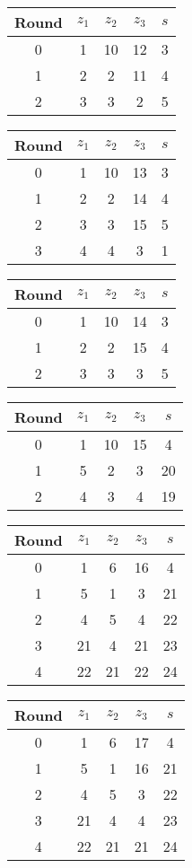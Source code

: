\begin{tabular}{c | c | c | c | c }
Round & $z_1$ & $z_2$ & $z_3$ & $s$ \\
\hline
0 & 1 & 10 & 12 & 3 \\
1 & 2 & 2 & 11 & 4 \\
2 & 3 & 3 & 2 & 5
\end{tabular}

\begin{tabular}{c | c | c | c | c }
Round & $z_1$ & $z_2$ & $z_3$ & $s$ \\
\hline
0 & 1 & 10 & 13 & 3 \\
1 & 2 & 2 & 14 & 4 \\
2 & 3 & 3 & 15 & 5 \\
3 & 4 & 4 & 3 & 1
\end{tabular}

\begin{tabular}{c | c | c | c | c }
Round & $z_1$ & $z_2$ & $z_3$ & $s$ \\
\hline
0 & 1 & 10 & 14 & 3 \\
1 & 2 & 2 & 15 & 4 \\
2 & 3 & 3 & 3 & 5
\end{tabular}

\begin{tabular}{c | c | c | c | c }
Round & $z_1$ & $z_2$ & $z_3$ & $s$ \\
\hline
0 & 1 & 10 & 15 & 4 \\
1 & 5 & 2 & 3 & 20 \\
2 & 4 & 3 & 4 & 19
\end{tabular}

\begin{tabular}{c | c | c | c | c }
Round & $z_1$ & $z_2$ & $z_3$ & $s$ \\
\hline
0 & 1 & 6 & 16 & 4 \\
1 & 5 & 1 & 3 & 21 \\
2 & 4 & 5 & 4 & 22 \\
3 & 21 & 4 & 21 & 23 \\
4 & 22 & 21 & 22 & 24
\end{tabular}

\begin{tabular}{c | c | c | c | c }
Round & $z_1$ & $z_2$ & $z_3$ & $s$ \\
\hline
0 & 1 & 6 & 17 & 4 \\
1 & 5 & 1 & 16 & 21 \\
2 & 4 & 5 & 3 & 22 \\
3 & 21 & 4 & 4 & 23 \\
4 & 22 & 21 & 21 & 24
\end{tabular}

